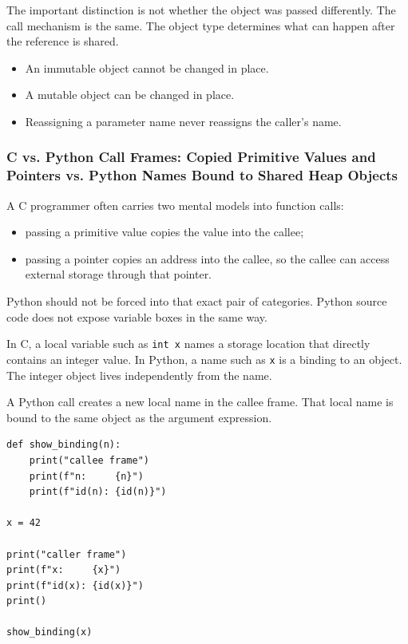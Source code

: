 The important distinction is not whether the object was passed differently. The call mechanism is the same. The object type determines what can happen after the reference is shared.

\begin{itemize}
    \item An immutable object cannot be changed in place.
    \item A mutable object can be changed in place.
    \item Reassigning a parameter name never reassigns the caller's name.
\end{itemize}

\subsubsection{C vs. Python Call Frames: Copied Primitive Values and Pointers vs. Python Names Bound to Shared Heap Objects}

A C programmer often carries two mental models into function calls:

\begin{itemize}
    \item passing a primitive value copies the value into the callee;
    \item passing a pointer copies an address into the callee, so the callee can access external storage through that pointer.
\end{itemize}

Python should not be forced into that exact pair of categories. Python source code does not expose variable boxes in the same way.

In C, a local variable such as \texttt{int x} names a storage location that directly contains an integer value. In Python, a name such as \texttt{x} is a binding to an object. The integer object lives independently from the name.

A Python call creates a new local name in the callee frame. That local name is bound to the same object as the argument expression.

\begin{verbatim}
def show_binding(n):
    print("callee frame")
    print(f"n:     {n}")
    print(f"id(n): {id(n)}")

x = 42

print("caller frame")
print(f"x:     {x}")
print(f"id(x): {id(x)}")
print()

show_binding(x)
\end{verbatim}


